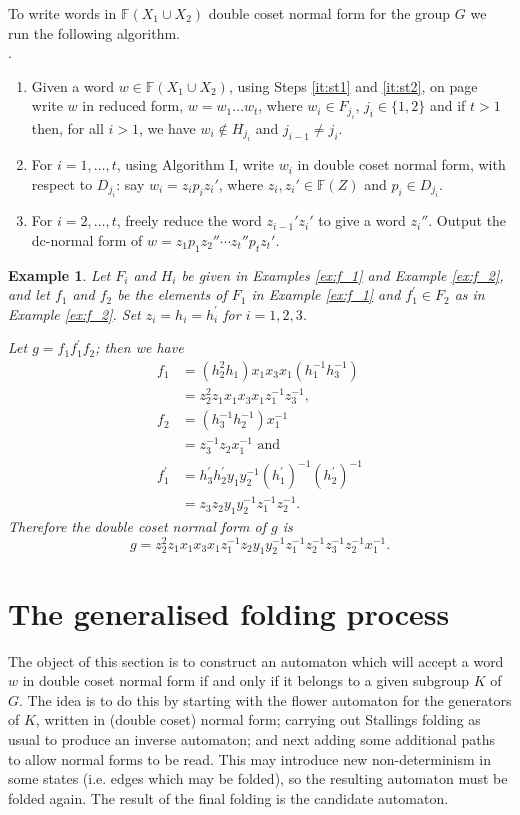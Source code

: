 \documentclass[a4paper,12pt]{article}
\newtheorem{exam}[theorem]{Example}
\newenvironment{example}{\begin{exam} \rm}{\end{exam}}
\numberwithin{equation}{section}
\numberwithin{figure}{section}
\newcommand{\FF}{\ensuremath{\mathbb{F}}}
\newcommand{\be}{\begin{enumerate}}
\newcommand{\ee}{\end{enumerate}}
\begin{document}
To write words in $\FF(X_1\cup X_2)$   double coset normal form  for
 the group $G$  we run the 
following algorithm. \\[1em]
.\\
\be
\item
Given a word $w\in \FF(X_1\cup X_2)$, 
using
Steps \ref{it:st1} and \ref{it:st2}, on page \pageref{it:st1} write $w$ in reduced form, 
$w=w_1\ldots w_t$, where $w_i\in F_{j_i}$, $j_i\in \{1,2\}$ and if $t>1$ then, 
for all $i>1$, we have $w_i\notin H_{j_i}$  and $j_{i-1}\neq j_i$.  
\item
For $i=1,\ldots ,t$, using Algorithm I,  write $w_i$ in double coset 
normal form, with  respect to $D_{j_i}$: say $w_i=z_ip_iz_i'$, where
$z_i,z_i'\in \FF(Z)$ and $p_i\in D_{j_i}$.  
\item
For $i=2,\ldots, t$, freely reduce the word $z_{i-1}'z_i'$ to give
a word $z_i''$. Output the  dc-normal form of $w= 
z_1p_1z_2'' \cdots z_t''p_tz_t'$. 
\ee
\begin{example}\label{ex:g}
Let $F_i$ and $H_i$ be given in Examples \ref{ex:f_1} and
Example \ref{ex:f_2}, and
let $f_1$ and $f_2$ be the elements of $F_1$ in Example \ref{ex:f_1} and
$f_1^\prime\in F_2$ as in Example \ref{ex:f_2}.
Set $z_i = h_i = h_i^{\prime}$ for $i= 1,2,3$.

Let $g =f_1 f_1^\prime f_2$; then we have
\begin{align*}
f_1&=(h_2^{2}h_1) x_1x_3x_1 (h_1^{-1}h_3^{-1})\\
&=z_2^2z_1  x_1x_3x_1z_1^{-1}z_3^{-1},\\
f_2&=(h_3^{-1}h_2^{-1}) x_1^{-1}\\
&=z_3^{-1}z_2 x_1^{-1}\textrm{ and }\\
f_1^\prime&=h^\prime_3h_2^\prime y_1y_2^{-1} (h_1^\prime)^{-1}(h_2^\prime)^{-1}\\
&= z_3z_2 y_1y_2^{-1} z_1^{-1}z_2^{-1}.
\end{align*}
Therefore the double coset normal form of $g$ is
\[g=z_2^2 z_1  x_1 x_3 x_1 z_1^{-1}
z_2y_1y_2^{-1} z_1^{-1}z_2^{-1}
z_3^{-1}z_2^{-1} x_1^{-1}.
\]
\end{example}

\section{The generalised folding process}\label{sec:foldings}

The object of this section is to construct an automaton which will accept a word
$w$ in double coset normal form if and only if it belongs to a
given subgroup $K$ of $G$. The idea is to do this by starting with the
flower automaton for the generators of $K$, written in (double
coset) normal form; carrying out Stallings folding as usual to
produce an inverse automaton; and next
adding some additional paths to allow normal forms to be read.
This may introduce new non-determinism in some  states (i.e. edges
which may be folded), so the resulting automaton must be folded
again. The result of the final folding is the candidate automaton.
\end{document}
